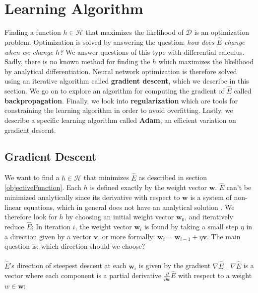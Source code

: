 \section{Learning Algorithm}
\label{learningAlgorithm}
Finding a function $h \in \mathcal{H}$ that maximizes the likelihood of $\mathcal{D}$ is an optimization problem. Optimization is solved by answering the question: \textit{how does $\hat{E}$ change when we change $h$?} We answer questions of this type with differential calculus. Sadly, there is no known method for finding the $h$ which maximizes the likelihood by analytical differentiation. Neural network optimization is therefore solved using an iterative algorithm called \textbf{gradient descent}, which we describe in this section. We go on to explore an algorithm for computing the gradient of $\hat{E}$ called \textbf{backpropagation}. Finally, we look into \textbf{regularization} which are tools for constraining the learning algorithm in order to avoid overfitting. Lastly, we describe a specific learning algorithm called \textbf{Adam}, an efficient variation on gradient descent.

\subsection{Gradient Descent}
\label{gradient_descent}
We want to find a $h \in \mathcal{H}$ that minimizes $\hat{E}$ as described in section \ref{objectiveFunction}. Each $h$ is defined exactly by the weight vector $\mathbf{w}$. $\hat{E}$ can't be minimized analytically since its derivative with respect to $\mathbf{w}$ is a system of non-linear equations, which in general does not have an analytical solution \citep{goodfellow16}. We therefore look for $h$ by choosing an initial weight vector $\mathbf{w}_0$, and iteratively reduce $\hat{E}$: In iteration $i$, the weight vector $\mathbf{w}_i$ is found by taking a small step $\eta$ in a direction given by a vector $\mathbf{v}$, or more formally: $\mathbf{w}_i = \mathbf{w}_{i-1} + \eta\mathbf{v}$. The main question is: which direction should we choose? 
\\\\ 
$\hat{E}$'s direction of steepest descent at each $\mathbf{w}_i$ is given by the gradient $\nabla\hat{E}$ \citep{yaser12}. $\nabla \hat{E}$ is a vector where each component is a partial derivative $\frac{\partial}{\partial w}\hat{E}$ with respect to a weight $w \in \mathbf{w}$:

